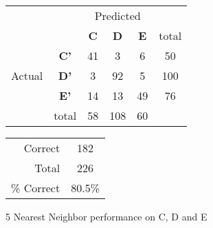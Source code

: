 	
\begin{figure}[ht]
\begin{minipage}[b]{0.5\linewidth}
\centering
	\begin{tabular}{ccc|c|c|c}
	 & &\multicolumn{3}{c}{Predicted} &\\
	  & & \bf{C} &  \bf{D} & \bf{E} & total \\
	 \cline{3-5}
	 \multirow{3}{*}{\begin{sideways}Actual\end{sideways}} & \bf{C'}& 41 & 3 & 6 & 50\\
	 \cline{3-6}
	 & \bf{D'}& 3 & 92 & 5 & 100\\
	  \cline{3-6}
	 & \bf{E'}& 14 & 13 & 49 &  76\\
	  \cline{3-6}
	 &total&58&108&60\\
	\end{tabular}
\end{minipage}
\hspace{0.5cm}
\begin{minipage}[b]{0.5\linewidth}
	\begin{tabular}{r|c}
	\hline
	Correct& 182\\
	Total& 226\\
	\hline
	\% Correct& 80.5\%\\
	\hline
	\end{tabular}
\end{minipage}
\vspace{1mm}
\caption{5 Nearest Neighbor performance on C, D and E}
\end{figure}
 


 
\clearpage
